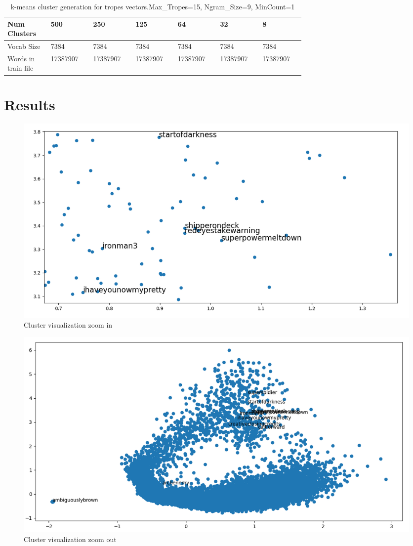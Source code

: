 \documentclass[letterpaper]{article}
\begin{document}
	

	
	\begin{table}[ht]
		\centering
		\begin{tabular}{|p{0.1\linewidth}|p{0.1\linewidth}|p{0.1\linewidth}|p{0.1\linewidth}|p{0.1\linewidth}|p{0.1\linewidth}|p{0.1\linewidth}|}
			\hline
			\textbf{Num Clusters}& \textbf{500} & \textbf{250} & \textbf{125} & \textbf{64} & \textbf{32} & \textbf{8}\\
			\hline
			\hline
			Vocab Size& 7384 & 7384 & 7384 & 7384 & 7384 & 7384\\
			\hline
			Words in train file& 17387907 & 17387907 & 17387907 & 17387907 & 17387907 & 17387907\\
			\hline
			
		\end{tabular}
		\caption{k-means cluster generation for tropes vectors.Max\_Tropes=15, Ngram\_Size=9, MinCount=1}
		\label{tab:k-means-clusters}
	\end{table}	
	
	
	
	\section{Results}
	\label{sec:res}
	
		\begin{figure}
		\centering
		\includegraphics[width=1\linewidth]{../images/cluster-36-visualization-new-corpus-v3-1024-ironman3-font-16-zoom-in.png}
		\caption{Cluster visualization zoom in}
		\label{fig:cluster-visualization-zoom-in}
	\end{figure}
	
	
	\begin{figure}
		\centering
		\includegraphics[width=1\linewidth]{../images/cluster-36-visualization-new-corpus-v3-1024-ironman3-zoom-out.png}
		\caption{Cluster visualization zoom out}
		\label{fig:cluster-visualization-zoom-out}
	\end{figure}
	
\end{document}
